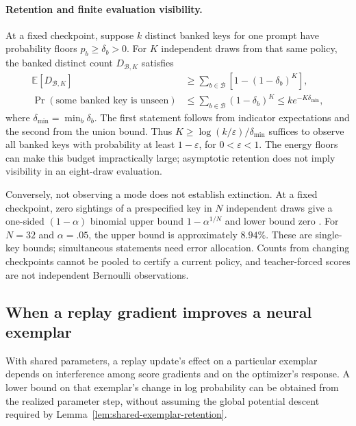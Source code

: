 \documentclass{article}
\newcommand{\1}{\mathbf 1}
\theoremstyle{remark}
\theoremstyle{definition}
\theoremstyle{plain}
\begin{document}
\paragraph{Retention and finite evaluation visibility.}
At a fixed checkpoint, suppose $k$ distinct banked keys for one prompt have
probability floors $p_b\ge\delta_b>0$. For $K$ independent draws from that
same policy, the banked distinct count $D_{\mathcal B,K}$ satisfies
\[
 \begin{aligned}
 \mathbb E[D_{\mathcal B,K}]
 &\ge\sum_{b\in\mathcal B}\left[1-(1-\delta_b)^K\right],\\
 \Pr(\text{some banked key is unseen})
 &\le\sum_{b\in\mathcal B}(1-\delta_b)^K
 \le k e^{-K\delta_{\min}},
 \end{aligned}
\]
where $\delta_{\min}=\min_b\delta_b$. The first statement follows from
indicator expectations and the second from the union bound. Thus
$K\ge\log(k/\varepsilon)/\delta_{\min}$ suffices to observe all banked keys
with probability at least $1-\varepsilon$, for $0<\varepsilon<1$.
The energy floors can make this budget impractically large; asymptotic
retention does not imply visibility in an eight-draw evaluation.

Conversely, not observing a mode does not establish extinction. At a fixed
checkpoint, zero sightings of a prespecified key in $N$ independent draws
give a one-sided $(1-\alpha)$ binomial upper bound
$1-\alpha^{1/N}$ and lower bound zero \citep{clopper1934binomial}. For
$N=32$ and $\alpha=.05$, the upper bound is approximately $8.94\%$.
These are single-key bounds; simultaneous statements need error allocation.
Counts from changing checkpoints cannot be pooled to certify a current
policy, and teacher-forced scores are not independent Bernoulli observations.

\subsection{When a replay gradient improves a neural exemplar}
\label{app:theory-neural-replay-response}

With shared parameters, a replay update's effect on a particular exemplar
depends on interference among score gradients and on the optimizer's
response. A lower bound on that exemplar's change in log probability can be
obtained from the realized parameter step, without assuming the global
potential descent required by Lemma~\ref{lem:shared-exemplar-retention}.
\end{document}
